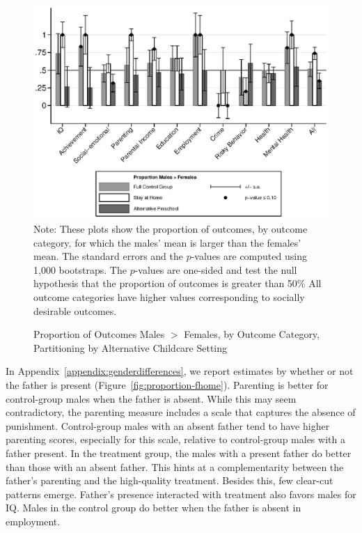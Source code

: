 \begin{figure}[H]
\centering
\caption{Proportion of Outcomes Males $>$ Females, by Outcome Category, Partitioning by Alternative Childcare Setting}
\label{fig:proportion-altpre}
	\includegraphics[width=\textwidth]{output/gendergaps-control-moderated-altpre}
\footnotesize \justify
Note: These plots show the proportion of outcomes, by outcome category, for which the males' mean is larger than the females' mean. The standard errors and the $p$-values are computed using 1,000 bootstraps. The $p$-values are one-sided and test the null hypothesis that the proportion of outcomes is greater than 50\% All outcome categories have higher values corresponding to socially desirable outcomes.
\end{figure}

In Appendix~\ref{appendix:genderdifferences}, we report estimates by whether or not the father is present (Figure~\ref{fig:proportion-fhome}). Parenting is better for control-group males when the father is absent. While this may seem contradictory, the parenting measure includes a scale that captures the absence of punishment. Control-group males with an absent father tend to have higher parenting scores, especially for this scale, relative to control-group males with a father present. In the treatment group, the males with a present father do better than those with an absent father. This hints at a complementarity between the father's parenting and the high-quality treatment. Besides this, few clear-cut patterns emerge. Father's presence interacted with treatment also favors males for IQ. Males in the control group do better when the father is absent in employment.

